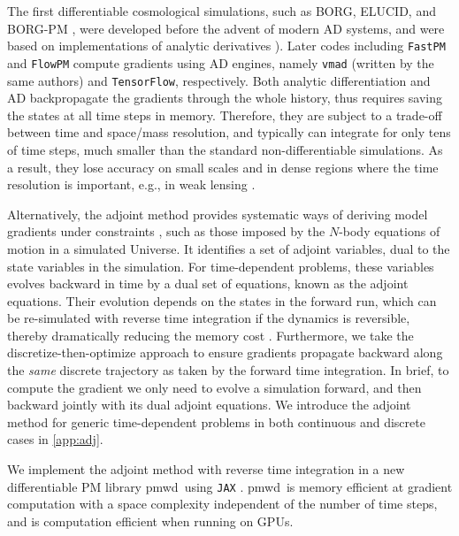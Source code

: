 \documentclass[modern, trackchanges, dvipsnames]{aastex631}
\newcommand{\pmwd}{{\usefont{T1}{nova}{m}{sl}pmwd}}
\begin{document}
The first differentiable cosmological simulations, such as BORG, ELUCID,
and BORG-PM \citep{BORG, ELUCID, BORG-PM}, were developed before the
advent of modern AD systems, and were based on implementations of
analytic derivatives \citep[see e.g.,][App.~D]{SeljakEtAl2017}).
Later codes including \texttt{FastPM} and \texttt{FlowPM} \citep{FastPM,
vmad, SeljakEtAl2017, FlowPM} compute gradients using AD engines, namely
\texttt{vmad} (written by the same authors) and \texttt{TensorFlow},
respectively.
Both analytic differentiation and AD backpropagate the gradients through
the whole history, thus requires saving the states at all time steps in
memory.
Therefore, they are subject to a trade-off between time and space/mass
resolution, and typically can integrate for only tens of time steps,
much smaller than the standard non-differentiable simulations.
As a result, they lose accuracy on small scales and in dense regions
where the time resolution is important, e.g., in weak lensing
\citep{MADLens}.

Alternatively, the adjoint method provides systematic ways of deriving
model gradients under constraints \citep{Pontryagin1962}, such as those
imposed by the $N$-body equations of motion in a simulated Universe.
It identifies a set of adjoint variables, dual to the state variables in
the simulation.
For time-dependent problems, these variables evolves backward in time by
a dual set of equations, known as the adjoint equations.
Their evolution depends on the states in the forward run, which can be
re-simulated with reverse time integration if the dynamics is
reversible, thereby dramatically reducing the memory cost
\citep{NeuralODE}.
Furthermore, we take the discretize-then-optimize approach
\citep[e.g.,][]{ANODE} to ensure gradients propagate backward along the
\emph{same} discrete trajectory as taken by the forward time
integration.
In brief, to compute the gradient we only need to evolve a simulation
forward, and then backward jointly with its dual adjoint equations.
We introduce the adjoint method for generic time-dependent problems in
both continuous and discrete cases in \autoref{app:adj}.

We implement the adjoint method with reverse time integration in a new
differentiable PM library \pmwd\ using \texttt{JAX} \citep{pmwd}.
\pmwd\ is memory efficient at gradient computation with a space
complexity independent of the number of time steps, and is computation
efficient when running on GPUs.
\end{document}
